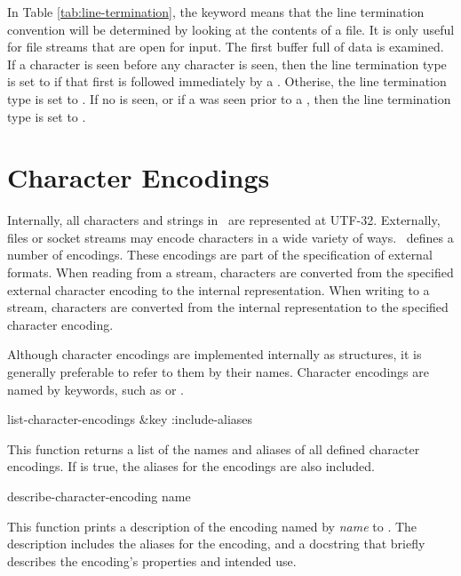 In Table \ref{tab:line-termination}, the  keyword means that
the line termination convention will be determined by looking at the
contents of a file.  It is only useful for file streams that are open
for input.  The first buffer full of data is examined.  If a
 character is seen before any 
character is seen, then the line termination type is set to
 if that first  is followed immediately
by a .  Otherise, the line termination type is set
to .  If no  is seen, or if a
 was seen prior to a , then the
line termination type is set to .

\section{Character Encodings}

Internally, all characters and strings in \CCL\ are represented at
UTF-32.  Externally, files or socket streams may encode characters in
a wide variety of ways.  \CCL\ defines a number of encodings.  These
encodings are part of the specification of external formats.  When
reading from a stream, characters are converted from the specified
external character encoding to the internal representation. When
writing to a stream, characters are converted from the internal
representation to the specified character encoding.

Although character encodings are implemented internally as structures,
it is generally preferable to refer to them by their names.  Character
encodings are named by keywords, such as  or
.

\begin{defun}[Function]
list-character-encodings &key :include-aliases

This function returns a list of the names and aliases of all defined
character encodings.  If  is true, the aliases
for the encodings are also included.
\end{defun}

\begin{defun}[Function]
describe-character-encoding name

This function prints a description of the encoding named by
{\it name} to .  The description includes
the aliases for the encoding, and a docstring that briefly
describes the encoding's properties and intended use.
\end{defun}

